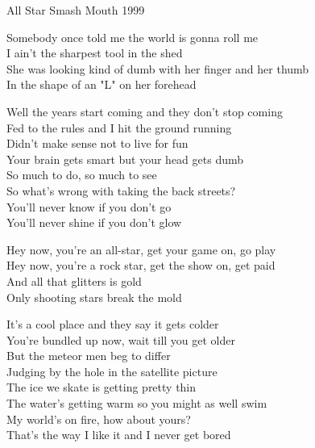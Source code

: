 \begin{song}{All Star}
  {} %
  {\SBOrgMel} %
  {Smash Mouth} %
  {1999} %
  {\NotCCLIed} %

  \begin{SBSection*}
    Somebody once told me the world is gonna roll me\\
    I ain't the sharpest tool in the shed\\
    She was looking kind of dumb with her finger and her thumb\\
    In the shape of an "L" on her forehead
  \end{SBSection*}

  \begin{SBVerse}
    Well the years start coming and they don't stop coming\\
    Fed to the rules and I hit the ground running\\
    Didn't make sense not to live for fun\\
    Your brain gets smart but your head gets dumb\\\medskip
    So much to do, so much to see\\
    So what's wrong with taking the back streets?\\
    You'll never know if you don't go\\
    You'll never shine if you don't glow
  \end{SBVerse}

  \begin{SBChorus}
    Hey now, you're an all-star, get your game on, go play\\
    Hey now, you're a rock star, get the show on, get paid\\
    And all that glitters is gold\\
    Only shooting stars break the mold
  \end{SBChorus}

  \begin{SBVerse}
    It's a cool place and they say it gets colder\\
    You're bundled up now, wait till you get older\\
    But the meteor men beg to differ\\
    Judging by the hole in the satellite picture\\
    The ice we skate is getting pretty thin\\
    The water's getting warm so you might as well swim\\
    My world's on fire, how about yours?\\
    That's the way I like it and I never get bored
  \end{SBVerse}


\end{song}
